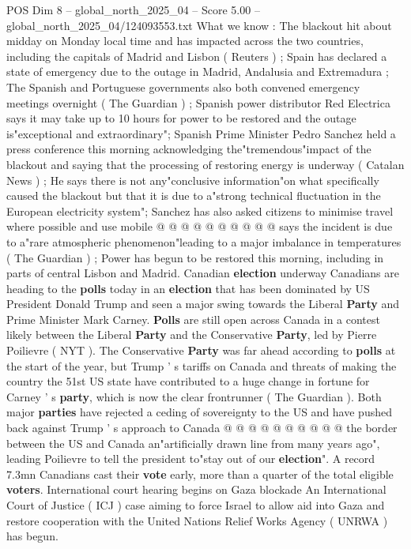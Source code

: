 \begin{textsample}{POS Dim 8 – global\_north\_2025\_04 – Score 5.00 – global\_north\_2025\_04/124093553.txt}
What we know : The blackout hit about midday on Monday local time and has impacted across the two countries, including the capitals of Madrid and Lisbon ( Reuters ) ; Spain has declared a state of emergency due to the outage in Madrid, Andalusia and Extremadura ; The Spanish and Portuguese governments also both convened emergency meetings overnight ( The Guardian ) ; Spanish power distributor Red Electrica says it may take up to 10 hours for power to be restored and the outage is"exceptional and extraordinary"; Spanish Prime Minister Pedro Sanchez held a press conference this morning acknowledging the"tremendous"impact of the blackout and saying that the processing of restoring energy is underway ( Catalan News ) ; He says there is not any"conclusive information"on what specifically caused the blackout but that it is due to a"strong technical fluctuation in the European electricity system"; Sanchez has also asked citizens to minimise travel where possible and use mobile @ @ @ @ @ @ @ @ @ @ says the incident is due to a"rare atmospheric phenomenon"leading to a major imbalance in temperatures ( The Guardian ) ; Power has begun to be restored this morning, including in parts of central Lisbon and Madrid.
Canadian \textbf{election} underway Canadians are heading to the \textbf{polls} today in an \textbf{election} that has been dominated by US President Donald Trump and seen a major swing towards the Liberal \textbf{Party} and Prime Minister Mark Carney. \textbf{Polls} are still open across Canada in a contest likely between the Liberal \textbf{Party} and the Conservative \textbf{Party}, led by Pierre Poilievre ( NYT ).
The Conservative \textbf{Party} was far ahead according to \textbf{polls} at the start of the year, but Trump ' s tariffs on Canada and threats of making the country the 51st US state have contributed to a huge change in fortune for Carney ' s \textbf{party}, which is now the clear frontrunner ( The Guardian ).
Both major \textbf{parties} have rejected a ceding of sovereignty to the US and have pushed back against Trump ' s approach to Canada @ @ @ @ @ @ @ @ @ @ the border between the US and Canada an"artificially drawn line from many years ago", leading Poilievre to tell the president to"stay out of our \textbf{election}".
A record 7.3mn Canadians cast their \textbf{vote} early, more than a quarter of the total eligible \textbf{voters}.
International court hearing begins on Gaza blockade An International Court of Justice ( ICJ ) case aiming to force Israel to allow aid into Gaza and restore cooperation with the United Nations Relief Works Agency ( UNRWA ) has begun.

\end{textsample}

